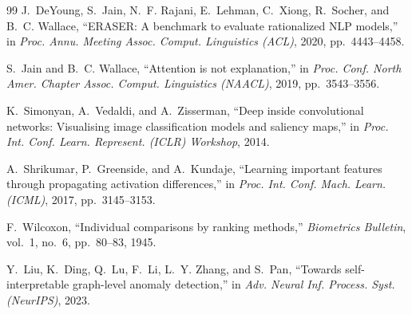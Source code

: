 \documentclass[conference]{IEEEtran}
\begin{document}
\begin{thebibliography}{99}
J.~DeYoung, S.~Jain, N.~F. Rajani, E.~Lehman, C.~Xiong, R.~Socher, and B.~C.
Wallace, ``ERASER: A benchmark to evaluate rationalized NLP models,'' in
\emph{Proc. Annu. Meeting Assoc. Comput. Linguistics (ACL)}, 2020,
pp.~4443--4458.

S.~Jain and B.~C. Wallace, ``Attention is not explanation,'' in \emph{Proc.
Conf. North Amer. Chapter Assoc. Comput. Linguistics (NAACL)}, 2019,
pp.~3543--3556.

K.~Simonyan, A.~Vedaldi, and A.~Zisserman, ``Deep inside convolutional
networks: Visualising image classification models and saliency maps,'' in
\emph{Proc. Int. Conf. Learn. Represent. (ICLR) Workshop}, 2014.

A.~Shrikumar, P.~Greenside, and A.~Kundaje, ``Learning important features
through propagating activation differences,'' in \emph{Proc. Int. Conf. Mach.
Learn. (ICML)}, 2017, pp.~3145--3153.

F.~Wilcoxon, ``Individual comparisons by ranking methods,'' \emph{Biometrics
Bulletin}, vol.~1, no.~6, pp.~80--83, 1945.

Y.~Liu, K.~Ding, Q.~Lu, F.~Li, L.~Y. Zhang, and S.~Pan, ``Towards
self-interpretable graph-level anomaly detection,'' in \emph{Adv. Neural Inf.
Process. Syst. (NeurIPS)}, 2023.

\end{thebibliography}
\end{document}
